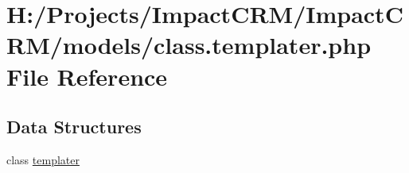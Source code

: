 \hypertarget{class_8templater_8php}{
\section{H:/Projects/ImpactCRM/ImpactCRM/models/class.templater.php File Reference}
\label{class_8templater_8php}
}
\subsection*{Data Structures}
\begin{DoxyCompactItemize}
\item 
class \hyperlink{classtemplater}{templater}
\end{DoxyCompactItemize}
